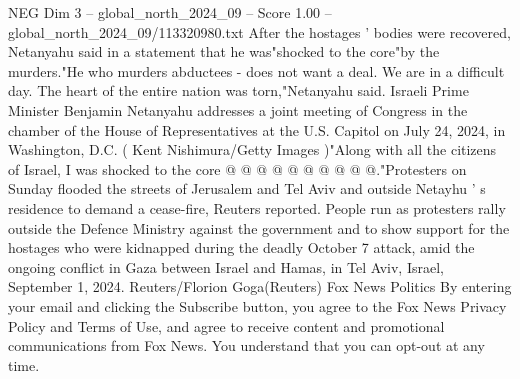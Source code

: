 \begin{textsample}{NEG Dim 3 – global\_north\_2024\_09 – Score 1.00 – global\_north\_2024\_09/113320980.txt}
After the hostages ' bodies were recovered, Netanyahu said in a statement that he was"shocked to the core"by the murders."He who murders abductees - does not want a deal.
We are in a difficult day.
The heart of the entire nation was torn,"Netanyahu said.
Israeli Prime Minister Benjamin Netanyahu addresses a joint meeting of Congress in the chamber of the House of Representatives at the U.S.
Capitol on July 24, 2024, in Washington, D.C. ( Kent Nishimura/Getty Images )"Along with all the citizens of Israel, I was shocked to the core @ @ @ @ @ @ @ @ @ @."Protesters on Sunday flooded the streets of Jerusalem and Tel Aviv and outside Netayhu ' s residence to demand a cease-fire, Reuters reported.
People run as protesters rally outside the Defence Ministry against the government and to show support for the hostages who were kidnapped during the deadly October 7 attack, amid the ongoing conflict in Gaza between Israel and Hamas, in Tel Aviv, Israel, September 1, 2024.
Reuters/Florion Goga(Reuters) Fox News Politics By entering your email and clicking the Subscribe button, you agree to the Fox News Privacy Policy and Terms of Use, and agree to receive content and promotional communications from Fox News.
You understand that you can opt-out at any time.

\end{textsample}

